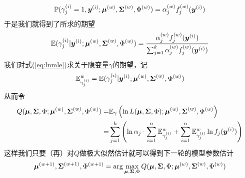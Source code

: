 \documentclass[a4paper,UTF8]{article}
\begin{document}
\begin{equation*}
    \mathbb{P}(\gamma^{(i)}_j=1,\boldsymbol{y}^{(i)};\boldsymbol{\mu}^{(w)},\boldsymbol{\Sigma}^{(w)},\Phi^{(w)})=\alpha^{(w)}_jf^{(w)}_j(\boldsymbol{y}^{(i)})
\end{equation*}于是我们就得到了所求的期望\begin{equation}
    \mathbb{E}(
            \gamma^{(i)}_j|\boldsymbol{y}^{(i)};\boldsymbol{\mu}^{(w)},\boldsymbol{\Sigma}^{(w)},\Phi^{(w)}
        )=\frac{
            \alpha^{(w)}_jf^{(w)}_j(\boldsymbol{y}^{(i)})
        }{
            \sum_{j=1}^k\alpha^{(w)}_jf^{(w)}_j(\boldsymbol{y}^{(i)})
        }
\end{equation}我们对式(\ref{eq:lnmle})求关于隐变量\(\gamma\)的期望，记\[
    \mathbb{E}_{\gamma^{(i)}_j}^w=\mathbb{E}(
        \gamma^{(i)}_j|\boldsymbol{y}^{(i)};\boldsymbol{\mu}^{(w)},\boldsymbol{\Sigma}^{(w)},\Phi^{(w)}
    )
\]从而令\begin{equation}\label{eq:Q}
    \begin{split}
        Q(\boldsymbol{\mu},\boldsymbol{\Sigma},\Phi;\boldsymbol{\mu}^{(w)},\boldsymbol{\Sigma}^{(w)},\Phi^{(w)})
        =&\mathbb{E}_\gamma\left(\ln L(\boldsymbol{\mu},\boldsymbol{\Sigma},\Phi);\boldsymbol{\mu}^{(w)},\boldsymbol{\Sigma}^{(w)},\Phi^{(w)}\right)\\
        =&\sum_{j=1}^k\left( 
            \ln\alpha_j\cdot\sum_{i=1}^n\mathbb{E}_{\gamma^{(i)}_j}^w+\sum_{i=1}^n\mathbb{E}_{\gamma^{(i)}_j}^w\ln f_j(\boldsymbol{y}^{(i)})
        \right)
    \end{split}
\end{equation}
这样我们只要（再）对\(Q\)做极大似然估计就可以得到下一轮的模型参数估计\begin{equation}
    \boldsymbol{\mu}^{(w+1)},\boldsymbol{\Sigma}^{(w+1)},\Phi^{(w+1)}=\arg\max_{\boldsymbol{\mu},\boldsymbol{\Sigma},\Phi}Q(\boldsymbol{\mu},\boldsymbol{\Sigma},\Phi;\boldsymbol{\mu}^{(w)},\boldsymbol{\Sigma}^{(w)},\Phi^{(w)})
\end{equation}
\end{document}

